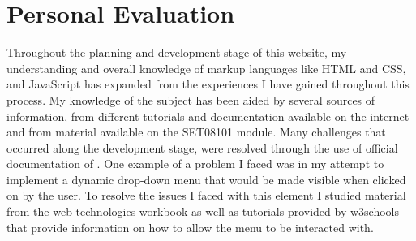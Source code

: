 \documentclass[10pt, a4paper]{article}
\begin{document}
	
	\section{Personal Evaluation}
	Throughout the planning and development stage of this website, my understanding and overall knowledge of markup languages like HTML and CSS, and JavaScript has expanded from the experiences I have gained throughout this process. My knowledge of the subject has been aided by several sources of information, from different tutorials and documentation available on the internet and from material available on the SET08101 module. Many challenges that occurred along the development stage, were resolved through the use of official documentation of . One example of a problem I faced was in my attempt to implement a dynamic drop-down menu that would be made visible when clicked on by the user. To resolve the issues I faced with this element I studied material from the web technologies workbook as well as tutorials provided by w3schools that provide information on how to allow the menu to be interacted with. \cite{w3schools}
	
	
    
	
	
		

		
\end{document}
